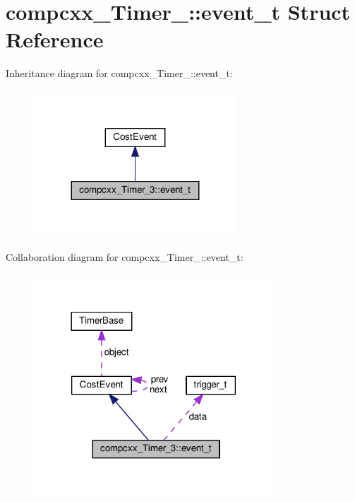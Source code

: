 \hypertarget{structcompcxx__Timer__3_1_1event__t}{}\section{compcxx\+\_\+\+Timer\+\_\+:\+:event\+\_\+t Struct Reference}
\label{structcompcxx__Timer__3_1_1event__t}


Inheritance diagram for compcxx\+\_\+\+Timer\+\_\+:\+:event\+\_\+t\+:\nopagebreak
\begin{figure}[H]
\begin{center}
\leavevmode
\includegraphics[width=215pt]{structcompcxx__Timer__3_1_1event__t__inherit__graph}
\end{center}
\end{figure}


Collaboration diagram for compcxx\+\_\+\+Timer\+\_\+:\+:event\+\_\+t\+:\nopagebreak
\begin{figure}[H]
\begin{center}
\leavevmode
\includegraphics[width=254pt]{structcompcxx__Timer__3_1_1event__t__coll__graph}
\end{center}
\end{figure}
